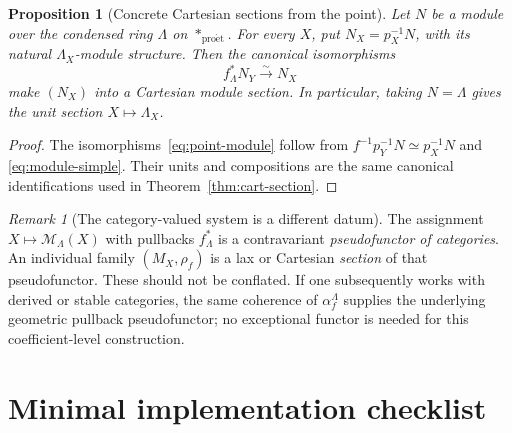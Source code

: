 \documentclass[11pt,a4paper]{article}
\numberwithin{equation}{section}
\newtheorem{proposition}[theorem]{Proposition}
\theoremstyle{definition}
\theoremstyle{remark}
\newtheorem{remark}[theorem]{Remark}
\newcommand{\proet}{\mathrm{pro\acute{e}t}}
\newcommand{\MM}{\mathcal M}
\begin{document}
\begin{proposition}[Concrete Cartesian sections from the point]
\label{prop:point-module}
Let $N$ be a module over the condensed ring $\Lambda$ on
$*_{\proet}$.  For every $X$, put $N_X=p_X^{-1}N$, with its natural
$\Lambda_X$-module structure.  Then the canonical isomorphisms
\begin{equation}\label{eq:point-module}
       f_\Lambda^*N_Y\xrightarrow{\sim}N_X
\end{equation}
make $(N_X)$ into a Cartesian module section.
In particular, taking $N=\Lambda$ gives the unit section
$X\mapsto\Lambda_X$.
\end{proposition}
\begin{proof}
The isomorphisms~\eqref{eq:point-module} follow from
$f^{-1}p_Y^{-1}N\simeq p_X^{-1}N$ and
\eqref{eq:module-simple}.  Their units and compositions are the same
canonical identifications used in Theorem~\ref{thm:cart-section}.
\end{proof}

\begin{remark}[The category-valued system is a different datum]
The assignment $X\mapsto\MM_\Lambda(X)$ with pullbacks
$f_\Lambda^*$ is a contravariant \emph{pseudofunctor of categories}.
An individual family $(M_X,\rho_f)$ is a lax or Cartesian
\emph{section} of that pseudofunctor.  These should not be conflated.
If one subsequently works with derived or stable categories, the same
coherence of $\alpha_f^\Lambda$ supplies the underlying geometric
pullback pseudofunctor; no exceptional functor is needed for this
coefficient-level construction.
\end{remark}

\section{Minimal implementation checklist}
\end{document}
